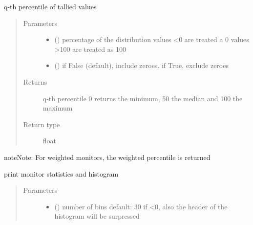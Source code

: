 \documentclass[letterpaper,10pt,english]{sphinxmanual}
\begin{document}
\begin{fulllineitems}
\begin{fulllineitems}
\label{\detokenize{Reference:salabim.Monitor.percentile}}
q-th percentile of tallied values
\begin{quote}\begin{description}
\item[{Parameters}] \leavevmode\begin{itemize}
\item {} 
 () \textendash{} percentage of the distribution 
values \textless{}0 are treated a 0 
values \textgreater{}100 are treated as 100

\item {} 
 () \textendash{} if False (default), include zeroes. if True, exclude zeroes

\end{itemize}

\item[{Returns}] \leavevmode
q-th percentile 
0 returns the minimum, 50 the median and 100 the maximum

\item[{Return type}] \leavevmode
float

\end{description}\end{quote}

\begin{sphinxadmonition}{note}{Note:}
For weighted monitors, the weighted percentile is returned
\end{sphinxadmonition}

\end{fulllineitems}


\begin{fulllineitems}
\label{\detokenize{Reference:salabim.Monitor.print_histogram}}
print monitor statistics and histogram
\begin{quote}\begin{description}
\item[{Parameters}] \leavevmode\begin{itemize}
\item {} 
 () \textendash{} number of bins 
default: 30 
if \textless{}0, also the header of the histogram will be surpressed


\end{itemize}
\end{description}
\end{quote}
\end{fulllineitems}
\end{fulllineitems}
\end{document}
